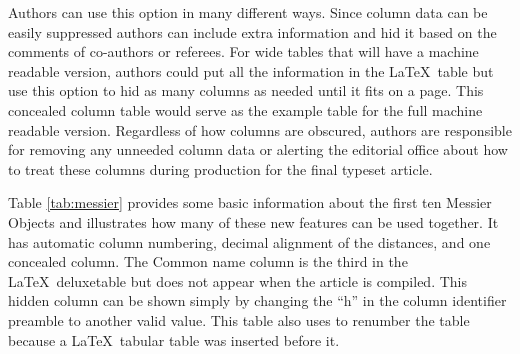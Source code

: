 \documentclass{aastex63}
\newcommand\latex{La\TeX}
\begin{document}
Authors can use this option in many different ways.  Since column data can
be easily suppressed authors can include extra information and hid it
based on the comments of co-authors or referees.  For wide tables that will
have a machine readable version, authors could put all the information in
the \latex\ table but use this option to hid as many columns as needed until
it fits on a page. This concealed column table would serve as the
example table for the full machine readable version.  Regardless of how
columns are obscured, authors are responsible for removing any unneeded
column data or alerting the editorial office about how to treat these
columns during production for the final typeset article.

Table \ref{tab:messier} provides some basic information about the first ten
Messier Objects and illustrates how many of these new features can be used
together.  It has automatic column numbering, decimal alignment of the
distances, and one concealed column.  The Common name column
is the third in the \latex\ deluxetable but does not appear when the article
is compiled. This hidden column can be shown simply by changing the ``h'' in
the column identifier preamble to another valid value.  This table also
uses {\tt\string\tablenum} to renumber the table because a \latex\ tabular
table was inserted before it.
\end{document}
